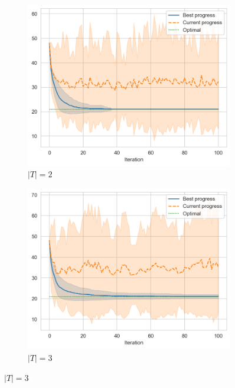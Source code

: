 \begin{figure}[ht]
    \centering
    \hfill
    \begin{subfigure}{0.45\textwidth}
        \centering
        \includegraphics[width=\textwidth]{../images/p1/added24s.png}
        \caption{\(|T| = 2\)}
    \end{subfigure}
    \hfill
    \begin{subfigure}{0.45\textwidth}
        \centering
        \includegraphics[width=\textwidth]{../images/p1/added34s.png}
        \caption{\(|T| = 3\)}
    \end{subfigure}
    \hfill


\end{figure}
